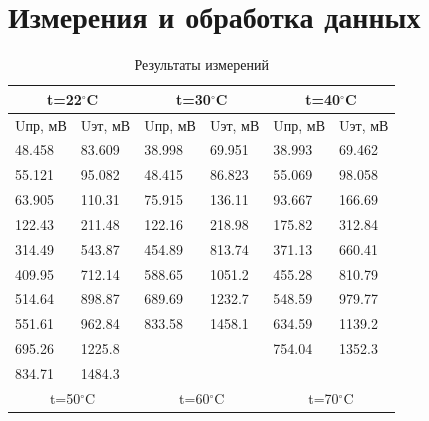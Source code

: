 \documentclass[a4paper,12pt]{article} %
\begin{document}
\section{Измерения и обработка данных}
\begin{table}[h!]
\caption{Результаты измерений}
\label{результаты}
\begin{tabular}{|ll|ll|ll|}
\hline
\multicolumn{2}{|c|}{t=22$^\circ$C}     & \multicolumn{2}{c|}{t=30$^\circ$C}     & \multicolumn{2}{c|}{t=40$^\circ$C}     \\ \hline
\multicolumn{1}{|l|}{Uпр, мВ} & Uэт, мВ & \multicolumn{1}{l|}{Uпр, мВ} & Uэт, мВ & \multicolumn{1}{l|}{Uпр, мВ} & Uэт, мВ \\ \hline
\multicolumn{1}{|l|}{48.458}  & 83.609  & \multicolumn{1}{l|}{38.998}  & 69.951  & \multicolumn{1}{l|}{38.993}  & 69.462  \\ \hline
\multicolumn{1}{|l|}{55.121}  & 95.082  & \multicolumn{1}{l|}{48.415}  & 86.823  & \multicolumn{1}{l|}{55.069}  & 98.058  \\ \hline
\multicolumn{1}{|l|}{63.905}  & 110.31  & \multicolumn{1}{l|}{75.915}  & 136.11  & \multicolumn{1}{l|}{93.667}  & 166.69  \\ \hline
\multicolumn{1}{|l|}{122.43}  & 211.48  & \multicolumn{1}{l|}{122.16}  & 218.98  & \multicolumn{1}{l|}{175.82}  & 312.84  \\ \hline
\multicolumn{1}{|l|}{314.49}  & 543.87  & \multicolumn{1}{l|}{454.89}  & 813.74  & \multicolumn{1}{l|}{371.13}  & 660.41  \\ \hline
\multicolumn{1}{|l|}{409.95}  & 712.14  & \multicolumn{1}{l|}{588.65}  & 1051.2  & \multicolumn{1}{l|}{455.28}  & 810.79  \\ \hline
\multicolumn{1}{|l|}{514.64}  & 898.87  & \multicolumn{1}{l|}{689.69}  & 1232.7  & \multicolumn{1}{l|}{548.59}  & 979.77  \\ \hline
\multicolumn{1}{|l|}{551.61}  & 962.84  & \multicolumn{1}{l|}{833.58}  & 1458.1  & \multicolumn{1}{l|}{634.59}  & 1139.2  \\ \hline
\multicolumn{1}{|l|}{695.26}  & 1225.8  & \multicolumn{1}{l|}{}        &         & \multicolumn{1}{l|}{754.04}  & 1352.3  \\ \hline
\multicolumn{1}{|l|}{834.71}  & 1484.3  & \multicolumn{1}{l|}{}        &         & \multicolumn{1}{l|}{}        &         \\ \hline
\multicolumn{2}{|c|}{t=50$^\circ$C}     & \multicolumn{2}{c|}{t=60$^\circ$C}     & \multicolumn{2}{c|}{t=70$^\circ$C}     \\ \hline

\end{tabular}
\end{table}
\end{document}
